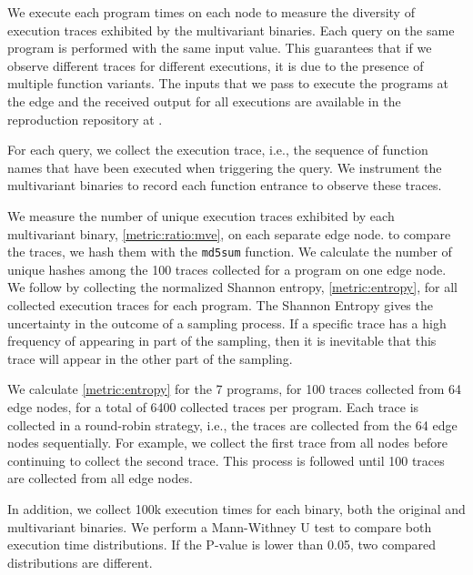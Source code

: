 We execute each program  times on each node to measure the diversity of execution traces exhibited by the multivariant binaries. Each query on the same program is performed with the same input value. This guarantees that if we observe different traces for different executions, it is due to the presence of multiple function variants. 
The inputs that we pass to execute the programs at the edge and the received output for all executions are available in the reproduction repository at . 

For each query, we collect the execution trace, i.e.,  the sequence of function names that have been executed when triggering the query.
We instrument the multivariant binaries to record each function entrance to observe these traces.

We measure the number of unique execution traces exhibited by each multivariant binary, \autoref{metric:ratio:mve}, on each separate edge node. to compare the traces, we hash them with the \texttt{md5sum} function.
We calculate the number of unique hashes among the 100 traces collected for a program on one edge node.
We follow by collecting the normalized Shannon entropy, \autoref{metric:entropy}, for all collected execution traces for each program.
The Shannon Entropy gives the uncertainty in the outcome of a sampling process.
If a specific trace has a high frequency of appearing in part of the sampling, then it is inevitable that this trace will appear in the other part of the sampling.


We calculate \autoref{metric:entropy} for the 7 programs, for 100 traces collected from 64 edge nodes, for a total of 6400 collected traces per program.
Each trace is collected in a round-robin strategy, i.e., the traces are collected from the 64 edge nodes sequentially.
For example, we collect the first trace from all nodes before continuing to collect the second trace.
This process is followed until 100 traces are collected from all edge nodes.


In addition, we collect 100k execution times for each binary, both the original and multivariant binaries.
We perform a Mann-Withney U test \cite{mann1947} to compare both execution time distributions. 
If the P-value is lower than 0.05, two compared distributions are different.
